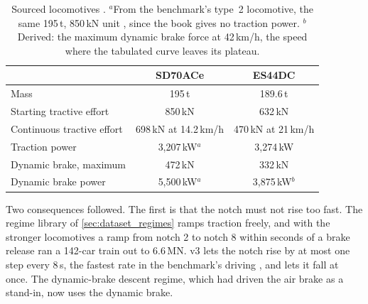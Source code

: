 \begin{table}[htbp]
    \centering
    \small
    \begin{tabular}{lcc}
        \toprule
        & SD70ACe & ES44DC \\
        \midrule
        Mass & 195\,t & 189.6\,t \\
        Starting tractive effort & 850\,kN & 632\,kN \\
        Continuous tractive effort & 698\,kN at 14.2\,km/h & 470\,kN at 21\,km/h \\
        Traction power & 3,207\,kW$^{a}$ & 3,274\,kW \\
        Dynamic brake, maximum & 472\,kN & 332\,kN \\
        Dynamic brake power & 5,500\,kW$^{a}$ & 3,875\,kW$^{b}$ \\
        \bottomrule
    \end{tabular}
    \caption{Sourced locomotives \cite[Tables~2.3 and 2.9]{Spiryagin2017HeavyHaul}. $^{a}$From the benchmark's type~2 locomotive, the same 195\,t, 850\,kN unit \cite{Spiryagin2017BenchmarkQuestions}, since the book gives no traction power. $^{b}$Derived: the maximum dynamic brake force at 42\,km/h, the speed where the tabulated curve leaves its plateau.}
    \label{tab:v3_locos}
\end{table}

Two consequences followed. The first is that the notch must not rise too fast. The regime library of \cref{sec:dataset_regimes} ramps traction freely, and with the stronger locomotives a ramp from notch 2 to notch 8 within seconds of a brake release ran a 142-car train out to 6.6\,MN. v3 lets the notch rise by at most one step every 8\,s, the fastest rate in the benchmark's driving \cite[Appendix~2]{Spiryagin2017BenchmarkQuestions}, and lets it fall at once. The dynamic-brake descent regime, which had driven the air brake as a stand-in, now uses the dynamic brake.

